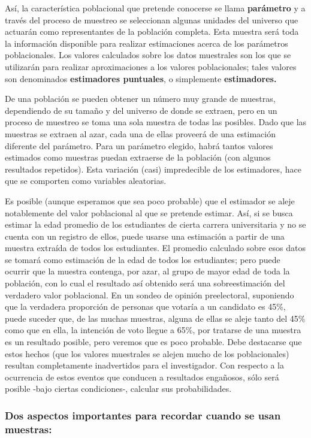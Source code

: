 \documentclass[]{book}
\begin{document}
Así, la característica poblacional que pretende conocerse se llama
\textbf{parámetro} y a través del proceso de muestreo se seleccionan algunas
unidades del universo que actuarán como representantes de la población
completa. Esta muestra será toda la información disponible para realizar
estimaciones acerca de los parámetros poblacionales. Los valores
calculados sobre los datos muestrales son los que se utilizarán para
realizar aproximaciones a los valores poblacionales; tales valores son
denominados \textbf{estimadores puntuales}, o simplemente \textbf{estimadores.}

De una población se pueden obtener un número muy grande de muestras,
dependiendo de su tamaño y del universo de donde se extraen, pero en un
proceso de muestreo se toma una sola muestra de todas las posibles. Dado
que las muestras se extraen al azar, cada una de ellas proveerá de una
estimación diferente del parámetro. Para un parámetro elegido, habrá
tantos valores estimados como muestras puedan extraerse de la población
(con algunos resultados repetidos). Esta variación (casi) impredecible
de los estimadores, hace que se comporten como variables aleatorias.

Es posible (aunque esperamos que sea poco probable) que el estimador se
aleje notablemente del valor poblacional al que se pretende estimar.
Así, si se busca estimar la edad promedio de los estudiantes de cierta
carrera universitaria y no se cuenta con un registro de ellos, puede
usarse una estimación a partir de una muestra extraída de todos los
estudiantes. El promedio calculado sobre esos datos se tomará como
estimación de la edad de todos los estudiantes; pero puede ocurrir que
la muestra contenga, por azar, al grupo de mayor edad de toda la
población, con lo cual el resultado así obtenido será una
sobreestimación del verdadero valor poblacional. En un sondeo de opinión preelectoral, suponiendo que la verdadera proporción de personas que votaría a un candidato es 45\%, puede suceder que, de las muchas muestras, alguna de ellas se aleje tanto del 45\% como que en ella, la intención de voto llegue a 65\%, por tratarse de una muestra es un resultado posible, pero veremos que es poco probable. Debe destacarse que estos hechos (que los valores muestrales se alejen mucho de los poblacionales) resultan completamente inadvertidos para el investigador. Con respecto a la ocurrencia de estos eventos que conducen a resultados engañosos, sólo será posible -bajo ciertas condiciones-, calcular sus probabilidades.

\hypertarget{dos-aspectos-importantes-para-recordar-cuando-se-usan-muestras}{%
\subsubsection{Dos aspectos importantes para recordar cuando se usan muestras:}\label{dos-aspectos-importantes-para-recordar-cuando-se-usan-muestras}}
\end{document}

